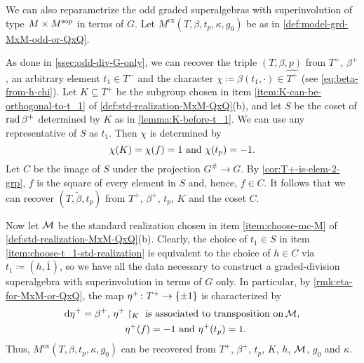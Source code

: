 We can also reparametrize the odd graded superalgebras with superinvolution of type $M\times M^{\mathrm{sop}}$ in terms of $G$. 
Let $M^{\mathrm{ex}}(T, \beta, t_p, \kappa, g_0)$ be as in \cref{def:model-grd-MxM-odd-or-QxQ}. 

As done in \cref{ssec:odd-div-G-only}, we can recover the triple $(T, \beta, p)$ from $T^+$, $\beta^+$, an arbitrary element $t_1 \in T^-$ and the character $\chi \coloneqq \beta(t_1, \cdot) \in \widehat{T^+}$ (see \cref{eq:beta-from-h-chi}). 
Let $K \subseteq T^+$ be the subgroup chosen in item \eqref{item:K-can-be-orthogonal-to-t_1} of \cref{def:std-realization-MxM-QxQ}(b), and let $S$ be the coset of $\operatorname{rad} \beta^+$ determined by $K$ as in \cref{lemma:K-before-t_1}. 
We can use any representative of $S$ as $t_1$. 
Then $\chi$ is determined by
\[\label{eq:equivalent-def-of-chi}
    \chi(K) = \chi(f) = 1 \,\,\text{and}\,\, \chi(t_p) = -1.
\]
Let $C$ be the image of $S$ under the projection $G^\# \to G$. 
By \cref{cor:T+-is-elem-2-grp}, $f$ is the square of every element in $S$ and, hence, $f \in C$.
It follows that we can recover $(T, \tilde\beta, t_p)$ from $T^+$, $\beta^+$, $t_p$, $K$ and the coset $C$. 

Now let $\mathcal M$ be the standard realization chosen in item \eqref{item:choose-mc-M} of \cref{def:std-realization-MxM-QxQ}(b). 
Clearly, the choice of $t_1 \in S$ in item \eqref{item:choose-t_1-std-realization} is equivalent to the choice of $h\in C$ via $t_1 \coloneqq (h, \bar 1)$, so we have all the data necessary to construct a graded-division superalgebra with superinvolution in terms of $G$ only. 
In particular, by \cref{rmk:eta-for-MxM-or-QxQ}, the map $\eta^+\colon T^+ \to \{ \pm 1 \}$ is characterized by
\[\label{eq:eta+-unsharpening-MxM}
    \begin{aligned}
        \mathrm{d}\eta^+ = \beta^+,\, \eta^+&\restriction_{K} \,\, \text{is associated to transposition on}\, \mathcal M,\\ 
        &\eta^+(f) = -1 \,\,\text{and}\,\, \eta^+(t_p) =1. 
    \end{aligned}
\]
Thus, $M^{\mathrm{ex}}(T, \beta, t_p, \kappa, g_0)$ can be recovered from $T^+$, $\beta^+$, $t_p$, $K$, $h$, $\mathcal M$, $g_0$ and $\kappa$. 


